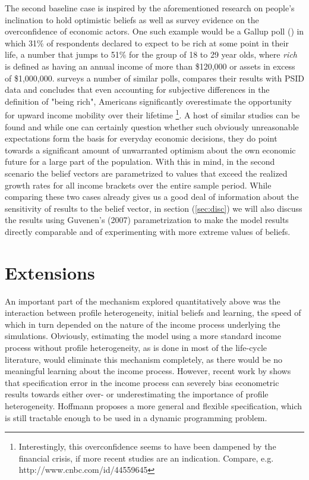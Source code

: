 The second baseline case is inspired by the aforementioned research on people's inclination to hold optimistic beliefs as well as survey evidence on the overconfidence of economic actors. One such example would be a Gallup poll (\citealp{Moore2003}) in which 31\% of respondents declared to expect to be rich at some point in their life, a number that jumps to 51\% for the group of 18 to 29 year olds, where \textit{rich} is defined as having an annual income of more than \$120,000 or assets in excess of \$1,000,000. \citet{DiPrete2007} surveys a number of similar polls, compares their results with PSID data and concludes that even accounting for subjective differences in the definition of "being rich", Americans significantly overestimate the opportunity for upward income mobility over their lifetime \footnote{Interestingly, this overconfidence seems to have been dampened by the financial crisis, if more recent studies are an indication. Compare, e.g. http://www.cnbc.com/id/44559645}. A host of similar studies can be found and while one can certainly question whether such obviously unreasonable expectations form the basis for everyday economic decisions, they do point towards a significant amount of unwarranted optimism about the own economic future for a large part of the population. With this in mind, in the second scenario the belief vectors are parametrized to values that exceed the realized growth rates for all income brackets over the entire sample period. While comparing these two cases already gives us a good deal of information about the sensitivity of results to the belief vector, in section (\ref{sec:disc}) we will also discuss the results using Guvenen's (2007) parametrization to make the model results directly comparable and of experimenting with more extreme values of beliefs.  

\pagebreak
\section{Extensions}\label{sec:ext}
An important part of the mechanism explored quantitatively above was the interaction between profile heterogeneity, initial beliefs and learning, the speed of which in turn depended on the nature of the income process underlying the simulations. Obviously, estimating the model using a more standard income process without profile heterogeneity, as is done in most of the life-cycle literature, would eliminate this mechanism completely, as there would be no meaningful learning about the income process. However, recent work by \citet{Hoffmann2013} shows that specification error in the income process can severely bias econometric results towards either over- or underestimating the importance of profile heterogeneity. Hoffmann proposes a more general and flexible specification, which is still tractable enough to be used in a dynamic programming problem.

